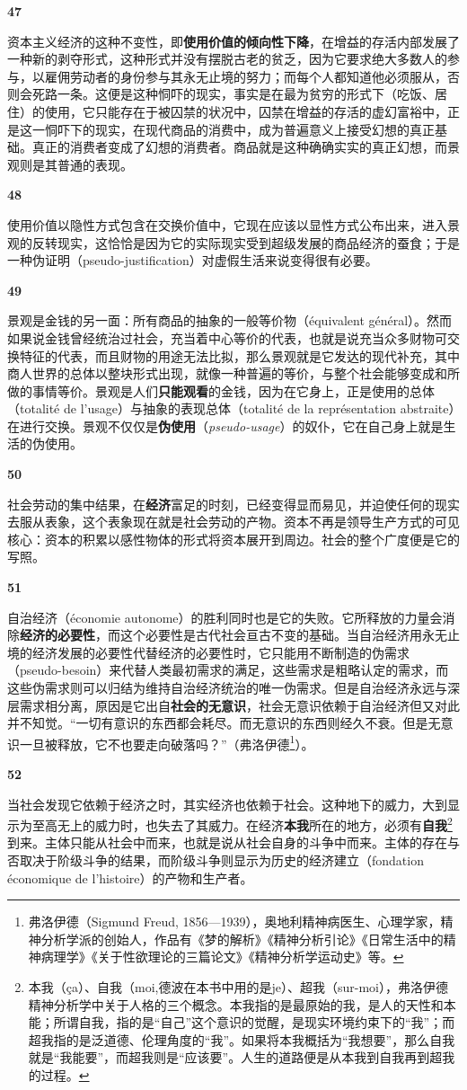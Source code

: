 \documentclass[fontset=fandol, a4paper, 12pt, openright]{ctexbook}
\makeatletter
\newcommand{\thesis}[1]{%
    \par\vspace{1.5em}%
    {\centering \textbf{\Large #1}\par}%
    \nobreak\vspace{0.5em}\nobreak
    \@afterindenttrue %
    \@afterheading    %
}
\makeatother
\begin{document}
\thesis{47}
资本主义经济的这种不变性，即\textbf{使用价值的倾向性下降}，在增益的存活内部发展了一种新的剥夺形式，这种形式并没有摆脱古老的贫乏，因为它要求绝大多数人的参与，以雇佣劳动者的身份参与其永无止境的努力；而每个人都知道他必须服从，否则会死路一条。这便是这种恫吓的现实，事实是在最为贫穷的形式下（吃饭、居住）的使用，它只能存在于被囚禁的状况中，囚禁在增益的存活的虚幻富裕中，正是这一恫吓下的现实，在现代商品的消费中，成为普遍意义上接受幻想的真正基础。真正的消费者变成了幻想的消费者。商品就是这种确确实实的真正幻想，而景观则是其普通的表现。

\thesis{48}
使用价值以隐性方式包含在交换价值中，它现在应该以显性方式公布出来，进入景观的反转现实，这恰恰是因为它的实际现实受到超级发展的商品经济的蚕食；于是一种伪证明（pseudo-justification）对虚假生活来说变得很有必要。

\thesis{49}
景观是金钱的另一面：所有商品的抽象的一般等价物（équivalent général）。然而如果说金钱曾经统治过社会，充当着中心等价的代表，也就是说充当众多财物可交换特征的代表，而且财物的用途无法比拟，那么景观就是它发达的现代补充，其中商人世界的总体以整块形式出现，就像一种普遍的等价，与整个社会能够变成和所做的事情等价。景观是人们\textbf{只能观看}的金钱，因为在它身上，正是使用的总体（totalité de l'usage）与抽象的表现总体（totalité de la représentation abstraite）在进行交换。景观不仅仅是\textbf{伪使用}（\textit{pseudo-usage}）的奴仆，它在自己身上就是生活的伪使用。

\thesis{50}
社会劳动的集中结果，在\textbf{经济}富足的时刻，已经变得显而易见，并迫使任何的现实去服从表象，这个表象现在就是社会劳动的产物。资本不再是领导生产方式的可见核心：资本的积累以感性物体的形式将资本展开到周边。社会的整个广度便是它的写照。

\thesis{51}
自治经济（économie autonome）的胜利同时也是它的失败。它所释放的力量会消除\textbf{经济的必要性}，而这个必要性是古代社会亘古不变的基础。当自治经济用永无止境的经济发展的必要性代替经济的必要性时，它只能用不断制造的伪需求（pseudo-besoin）来代替人类最初需求的满足，这些需求是粗略认定的需求，而这些伪需求则可以归结为维持自治经济统治的唯一伪需求。但是自治经济永远与深层需求相分离，原因是它出自\textbf{社会的无意识}，社会无意识依赖于自治经济但又对此并不知觉。“一切有意识的东西都会耗尽。而无意识的东西则经久不衰。但是无意识一旦被释放，它不也要走向破落吗？”（弗洛伊德\footnote{弗洛伊德（Sigmund Freud, 1856—1939），奥地利精神病医生、心理学家，精神分析学派的创始人，作品有《梦的解析》《精神分析引论》《日常生活中的精神病理学》《关于性欲理论的三篇论文》《精神分析学运动史》等。}）。

\thesis{52}
当社会发现它依赖于经济之时，其实经济也依赖于社会。这种地下的威力，大到显示为至高无上的威力时，也失去了其威力。在经济\textbf{本我}所在的地方，必须有\textbf{自我}\footnote{本我（ça）、自我（moi,德波在本书中用的是je）、超我（sur-moi），弗洛伊德精神分析学中关于人格的三个概念。本我指的是最原始的我，是人的天性和本能；所谓自我，指的是“自己”这个意识的觉醒，是现实环境约束下的“我”；而超我指的是泛道德、伦理角度的“我”。如果将本我概括为“我想要”，那么自我就是“我能要”，而超我则是“应该要”。人生的道路便是从本我到自我再到超我的过程。}到来。主体只能从社会中而来，也就是说从社会自身的斗争中而来。主体的存在与否取决于阶级斗争的结果，而阶级斗争则显示为历史的经济建立（fondation économique de l'histoire）的产物和生产者。
\end{document}
